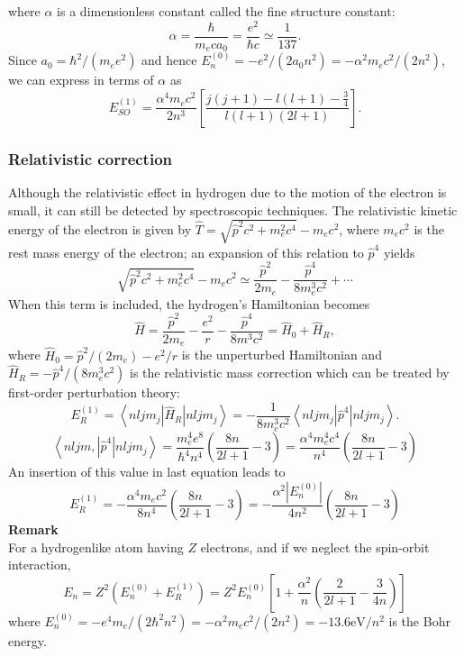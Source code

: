 where $\alpha$ is a dimensionless constant called the fine structure constant:
$$
\alpha=\frac{\hbar}{m_{e} c a_{0}}=\frac{e^{2}}{\hbar c} \simeq \frac{1}{137} .
$$
Since $a_{0}=\hbar^{2} /\left(m_{e} e^{2}\right)$ and hence $E_{n}^{(0)}=-e^{2} /\left(2 a_{0} n^{2}\right)=-\alpha^{2} m_{e} c^{2} /\left(2 n^{2}\right)$, we can express in terms of $\alpha$ as
$$
E_{S O}^{(1)}=\frac{\alpha^{4} m_{e} c^{2}}{2 n^{3}}\left[\frac{j(j+1)-l(l+1)-\frac{3}{4}}{l(l+1)(2 l+1)}\right] .
$$
\subsubsection{Relativistic correction}
Although the relativistic effect in hydrogen due to the motion of the electron is small, it can still be detected by spectroscopic techniques. The relativistic kinetic energy of the electron is given by $\hat{T}=\sqrt{\hat{p}^{2} c^{2}+m_{e}^{2} c^{4}}-m_{e} c^{2}$, where $m_{e} c^{2}$ is the rest mass energy of the electron; an expansion of this relation to $\hat{p}^{4}$ yields
$$
\sqrt{\hat{p}^{2} c^{2}+m_{e}^{2} c^{4}}-m_{e} c^{2} \simeq \frac{\hat{p}^{2}}{2 m_{e}}-\frac{\hat{p}^{4}}{8 m_{e}^{3} c^{2}}+\cdots
$$
When this term is included, the hydrogen's Hamiltonian becomes
$$
\hat{H}=\frac{\hat{p}^{2}}{2 m_{e}}-\frac{e^{2}}{r}-\frac{\hat{p}^{4}}{8 m^{3} c^{2}}=\hat{H}_{0}+\hat{H}_{R},
$$
where $\hat{H}_{0}=\hat{p}^{2} /\left(2 m_{e}\right)-e^{2} / r$ is the unperturbed Hamiltonian and $\hat{H}_{R}=-\hat{p}^{4} /\left(8 m_{e}^{3} c^{2}\right)$ is the relativistic mass correction which can be treated by first-order perturbation theory:
$$
E_{R}^{(1)}=\left\langle n l j m_{j}\left|\hat{H}_{R}\right| n l j m_{j}\right\rangle=-\frac{1}{8 m_{c}^{3} c^{2}}\left\langle n l j m_{j}\left|\hat{p}^{4}\right| n l j m_{j}\right\rangle .
$$
$$
\left\langle n l j m,\left|\hat{p}^{4}\right| n l j m_{j}\right\rangle=\frac{m_{e}^{4} e^{8}}{\hbar^{4} n^{4}}\left(\frac{8 n}{2 l+1}-3\right)=\frac{\alpha^{4} m_{e}^{4} c^{4}}{n^{4}}\left(\frac{8 n}{2 l+1}-3\right)
$$
An insertion of this value in last equation leads to
$$
E_{R}^{(1)}=-\frac{\alpha^{4} m_{e} c^{2}}{8 n^{4}}\left(\frac{8 n}{2 l+1}-3\right)=-\frac{\alpha^{2}\left|E_{n}^{(0)}\right|}{4 n^{2}}\left(\frac{8 n}{2 l+1}-3\right)
$$
\textbf{Remark}\\
For a hydrogenlike atom having $Z$ electrons, and if we neglect the spin-orbit interaction,
$$
E_{n}=Z^{2}\left(E_{n}^{(0)}+E_{R}^{(1)}\right)=Z^{2} E_{n}^{(0)}\left[1+\frac{\alpha^{2}}{n}\left(\frac{2}{2 l+1}-\frac{3}{4 n}\right)\right]
$$
where $E_{n}^{(0)}=-e^{4} m_{e} /\left(2 \hbar^{2} n^{2}\right)=-\alpha^{2} m_{e} c^{2} /\left(2 n^{2}\right)=-13.6 \mathrm{eV} / n^{2}$ is the Bohr energy.
